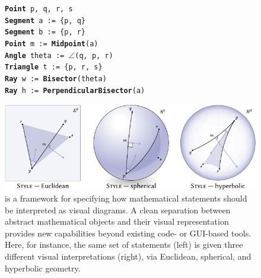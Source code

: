 \begin{figure}[h]
  \centering
\begin{minipage}{120pt}
   \fontsize{7pt}{8pt}\selectfont
   \texttt{\textbf{Point} p, q, r, s} \\
   \texttt{\textbf{Segment} a := \{p, q\}} \\
   \texttt{\textbf{Segment} b := \{p, r\}} \\
   \texttt{\textbf{Point} m := \textbf{Midpoint}(a)} \\
   \texttt{\textbf{Angle} theta := $\angle$(q, p, r)} \\
   \texttt{\textbf{Triangle} t := \{p, r, s\}} \\
   \texttt{\textbf{Ray} w := \textbf{Bisector}(theta)} \\
   \texttt{\textbf{Ray} h := \textbf{PerpendicularBisector}(a)} \\
\end{minipage}\hfill
\begin{minipage}{340pt}
   \includegraphics{assets/penrose/teaser.pdf}
\end{minipage}
   \caption{\Penrose{} is a framework for specifying how mathematical statements should be interpreted as visual diagrams.  A clean separation between abstract mathematical objects and their visual representation provides new capabilities beyond existing code- or GUI-based tools.  Here, for instance, the same set of statements (left) is given three different visual interpretations (right), via Euclidean, spherical, and hyperbolic geometry.
   \label{fig:penrose-teaser}
   }
\end{figure}

